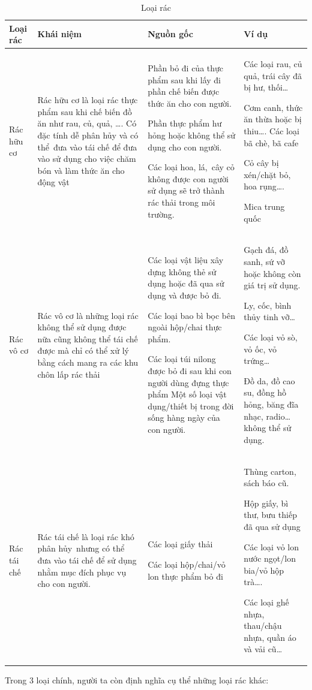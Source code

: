 \begin{table}[H]
    \begin{tabular}{| m{4em} | m{4cm} | m{4cm} | m{4cm} |}
        \hline
        Loại rác & Khái niệm & Nguồn gốc & Ví dụ \\
        \hline
        Rác hữu cơ &Rác hữu cơ là loại rác thực phẩm sau khi chế biến đồ ăn như rau, củ, quả, …. Có đặc tính dễ phân hủy và có thể đưa vào tái chế để đưa vào sử dụng cho việc chăm bón và làm thức ăn cho động vật
        &
        Phần bỏ đi của thực phẩm sau khi lấy đi phần chế biến được thức ăn cho con người.
         
         
         Phần thực phẩm hư hỏng hoặc không thể sử dụng cho con người.

        Các loại hoa, lá, cây cỏ không được con người sử dụng sẽ trở thành rác thải trong môi trường.& 
         Các loại rau, củ quả, trái cây đã bị hư, thối…

        Cơm canh, thức ăn thừa hoặc bị thiu…. Các loại bã chè, bã cafe
       
         Cỏ cây bị xén/chặt bỏ, hoa rụng….
        
         Mica trung quốc\\
         
        
        \hline
        Rác vô cơ &
        Rác vô cơ là những loại rác không thể sử dụng được nữa cũng không thể tái chế được mà chỉ có thể xử lý bằng cách mang ra các khu chôn lấp rác thải
        &
        Các loại vật liệu xây dựng không thẻ sử dụng hoặc đã qua sử dụng và được bỏ đi.

        Các loại bao bì bọc bên ngoài hộp/chai thực phẩm.

        Các loại túi nilong được bỏ đi sau khi con người dùng đựng thực phẩm
        Một số loại vật dụng/thiết bị trong đời sống hàng ngày của con người.
        &
         Gạch đá, đồ sanh, sứ vỡ hoặc không còn giá trị sử dụng.

         Ly, cốc, bình thủy tinh vỡ…

         Các loại vỏ sò, vỏ ốc, vỏ trứng…

         Đồ da, đồ cao su, đồng hồ hỏng, băng đĩa nhạc, radio… không thể sử dụng.\\

        \hline
        Rác tái chế
        &Rác tái chế là loại rác khó phân hủy nhưng có thể đưa vào tái chế để sử dụng nhằm mục đích phục vụ cho con người.
        & Các loại giấy thải

         Các loại hộp/chai/vỏ lon thực phẩm bỏ đi
        & Thùng carton, sách báo cũ.

         Hộp giấy, bì thư, bưu thiếp đã qua sử dụng

         Các loại vỏ lon nước ngọt/lon bia/vỏ hộp trà….

         Các loại ghế nhựa, thau/chậu nhựa, quần áo và vải cũ…\\
        
        \hline
    \end{tabular}
    \centering
    \caption{Loại rác} 
    \label{tab.garbage.type}
\end{table}
Trong 3 loại chính, người ta còn định nghĩa cụ thể những loại rác khác:

